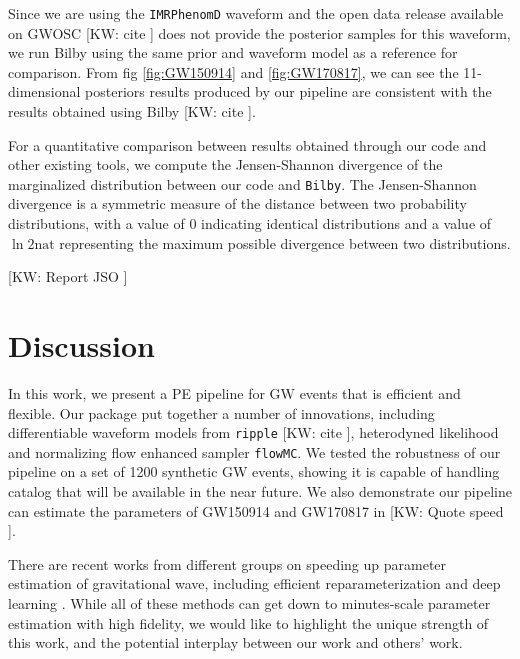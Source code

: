 \documentclass[twocolumn]{aastex631}
\newcommand{\kw}[1]{{\color{rb4}[KW: #1 ]}}
\begin{document}
Since we are using the \texttt{IMRPhenomD} waveform and the open data release
available on GWOSC \kw{cite} does not provide the posterior samples for this
waveform, we run Bilby using the same prior and waveform model as a reference
for comparison. From fig \ref{fig:GW150914} and \ref{fig:GW170817}, we can see
the 11-dimensional posteriors results produced by our pipeline are consistent
with the results obtained using Bilby \kw{cite}.


For a quantitative comparison between results obtained through our code and
other existing tools, we compute the Jensen-Shannon divergence of the
marginalized distribution between our code and \texttt{Bilby}. The
Jensen-Shannon divergence is a symmetric measure of the distance between two
probability distributions, with a value of 0 indicating identical distributions
and a value of $\ln{2} \textrm{nat}$ representing the maximum possible
divergence between two distributions.

\kw{Report JSO} 

\section{Discussion}
\label{sec: Discussion}

In this work, we present a PE pipeline for GW events that is efficient and
flexible. Our package put together a number of innovations, including
differentiable waveform models from \texttt{ripple} \kw{cite}, heterodyned
likelihood and normalizing flow enhanced sampler \texttt{flowMC}. We tested the
robustness of our pipeline on a set of 1200 synthetic GW events, showing it is
capable of handling catalog that will be available in the near future. We also
demonstrate our pipeline can estimate the parameters of GW150914 and GW170817 in
\kw{Quote speed}. 

There are recent works from different groups on speeding up parameter estimation
of gravitational wave, including efficient reparameterization
\cite{Islam:2022afg,Roulet:2022kot} and deep learning
\cite{Dax:2021tsq,Dax:2022pxd}. While all of these methods can get down to
minutes-scale parameter estimation with high fidelity, we would like to
highlight the unique strength of this work, and the potential interplay between
our work and others' work.
\end{document}

